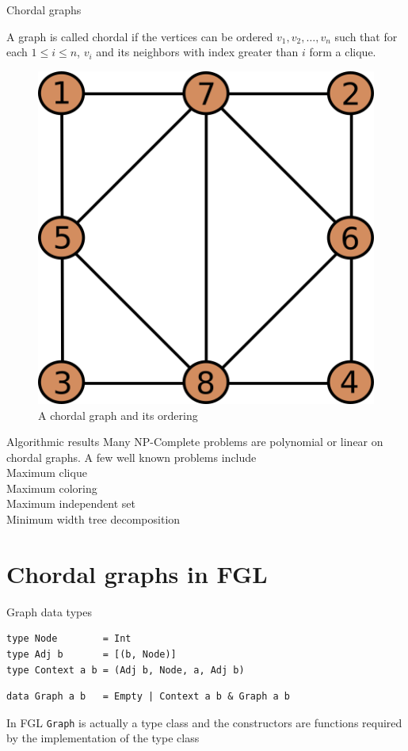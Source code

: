 \documentclass{beamer}
\begin{document}
\begin{frame}{Chordal graphs}
\begin{definition}
A graph is called chordal if the vertices can be ordered $v_1,v_2,\dots,v_n$ such that for each $1 \leq i \leq n$, $v_i$ and its neighbors with index greater than $i$ form a clique.
\end{definition}
\begin{figure}
    \includegraphics[scale=0.3]{g1107.png}
    \caption*{A chordal graph and its ordering}
\end{figure}
\end{frame}

\begin{frame}{Algorithmic results}
Many \textsf{NP}-Complete problems are polynomial or linear on chordal graphs. A few well known problems include\\

Maximum clique\\
Maximum coloring\\
Maximum independent set\\
Minimum width tree decomposition
\end{frame}

\section{Chordal graphs in FGL}

\begin{frame}[fragile]{Graph data types}
\begin{verbatim}
type Node        = Int
type Adj b       = [(b, Node)]
type Context a b = (Adj b, Node, a, Adj b)
\end{verbatim}
\begin{verbatim}
data Graph a b   = Empty | Context a b & Graph a b
\end{verbatim}
In FGL \texttt{Graph} is actually a type class and the constructors are functions required by the implementation of the type class
\end{frame}
\end{document}
